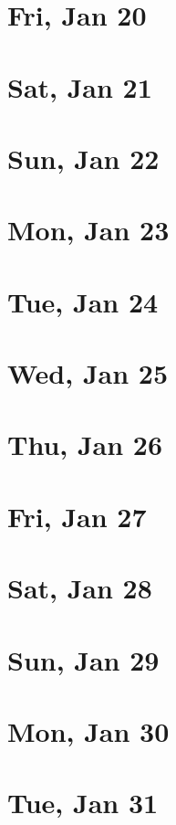 	\section{Fri, Jan 20}
		
		
	\section{Sat, Jan 21}
		
		
	\section{Sun, Jan 22}
		
		
	\section{Mon, Jan 23}
		
		
	\section{Tue, Jan 24}
		
		
	\section{Wed, Jan 25}
		
		
	\section{Thu, Jan 26}
		
		
	\section{Fri, Jan 27}
		
		
	\section{Sat, Jan 28}
		
		
	\section{Sun, Jan 29}
		
		
	\section{Mon, Jan 30}
		
		
	\section{Tue, Jan 31}
		
		
